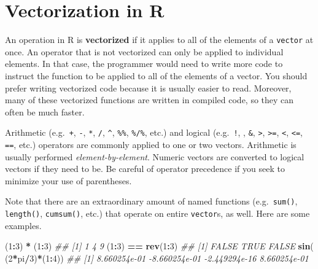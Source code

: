 \documentclass[12pt,krantz2]{krantz}
\makeatletter
\newenvironment{Shaded}{\begin{snugshade}}{\end{snugshade}}
\newcommand{\CommentTok}[1]{\textcolor[rgb]{0.37,0.37,0.37}{\textit{#1}}}
\newcommand{\DecValTok}[1]{\textcolor[rgb]{0.06,0.06,0.06}{#1}}
\newcommand{\KeywordTok}[1]{\textcolor[rgb]{0.27,0.27,0.27}{\textbf{#1}}}
\newcommand{\NormalTok}[1]{#1}
\newcommand{\OperatorTok}[1]{\textcolor[rgb]{0.43,0.43,0.43}{\textbf{#1}}}
\newcommand{\StringTok}[1]{\textcolor[rgb]{0.5,0.5,0.5}{#1}}
\newenvironment{kframe}{%
\medskip{}
\setlength{\fboxsep}{.8em}
 \def\at@end@of@kframe{}%
 \ifinner\ifhmode%
  \def\at@end@of@kframe{\end{minipage}}%
  \begin{minipage}{\columnwidth}%
 \fi\fi%
 \def\FrameCommand##1{\hskip\@totalleftmargin \hskip-\fboxsep
 \colorbox{shadecolor}{##1}\hskip-\fboxsep
     \hskip-\linewidth \hskip-\@totalleftmargin \hskip\columnwidth}%
 \MakeFramed {\advance\hsize-\width
   \@totalleftmargin\z@ \linewidth\hsize
   \@setminipage}}%
 {\par\unskip\endMakeFramed%
 \at@end@of@kframe}
\renewenvironment{Shaded}{\begin{kframe}}{\end{kframe}}
\makeatother
\begin{document}
\hypertarget{vectorization-in-r}{%
\section{Vectorization in R}\label{vectorization-in-r}}

An operation in R is \textbf{vectorized} if it applies to all of the elements of a \texttt{vector} at once. An operator that is not vectorized can only be applied to individual elements. In that case, the programmer would need to write more code to instruct the function to be applied to all of the elements of a vector. You should prefer writing vectorized code because it is usually easier to read. Moreover, many of these vectorized functions are written in compiled code, so they can often be much faster.

Arithmetic (e.g.~\texttt{+}, \texttt{-}, \texttt{*}, \texttt{/}, \texttt{\^{}}, \texttt{\%\%}, \texttt{\%/\%}, etc.) and logical (e.g.~\texttt{!}, \texttt{\textbar{}}, \texttt{\&}, \texttt{\textgreater{}}, \texttt{\textgreater{}=}, \texttt{\textless{}}, \texttt{\textless{}=}, \texttt{==}, etc.) operators are commonly applied to one or two vectors. Arithmetic is usually performed \emph{element-by-element}. Numeric vectors are converted to logical vectors if they need to be. Be careful of operator precedence if you seek to minimize your use of parentheses.

Note that there are an extraordinary amount of named functions (e.g.~\texttt{sum()}, \texttt{length()}, \texttt{cumsum()}, etc.) that operate on entire \texttt{vector}s, as well. Here are some examples.

\begin{Shaded}
\begin{Highlighting}[]
\NormalTok{(}\DecValTok{1}\OperatorTok{:}\DecValTok{3}\NormalTok{) }\OperatorTok{*}\StringTok{ }\NormalTok{(}\DecValTok{1}\OperatorTok{:}\DecValTok{3}\NormalTok{)        }
\CommentTok{## [1] 1 4 9}
\NormalTok{(}\DecValTok{1}\OperatorTok{:}\DecValTok{3}\NormalTok{) }\OperatorTok{==}\StringTok{ }\KeywordTok{rev}\NormalTok{(}\DecValTok{1}\OperatorTok{:}\DecValTok{3}\NormalTok{)    }
\CommentTok{## [1] FALSE  TRUE FALSE}
\KeywordTok{sin}\NormalTok{( (}\DecValTok{2}\OperatorTok{*}\NormalTok{pi}\OperatorTok{/}\DecValTok{3}\NormalTok{)}\OperatorTok{*}\NormalTok{(}\DecValTok{1}\OperatorTok{:}\DecValTok{4}\NormalTok{)) }
\CommentTok{## [1]  8.660254e-01 -8.660254e-01 -2.449294e-16  8.660254e-01}
\end{Highlighting}
\end{Shaded}
\end{document}
